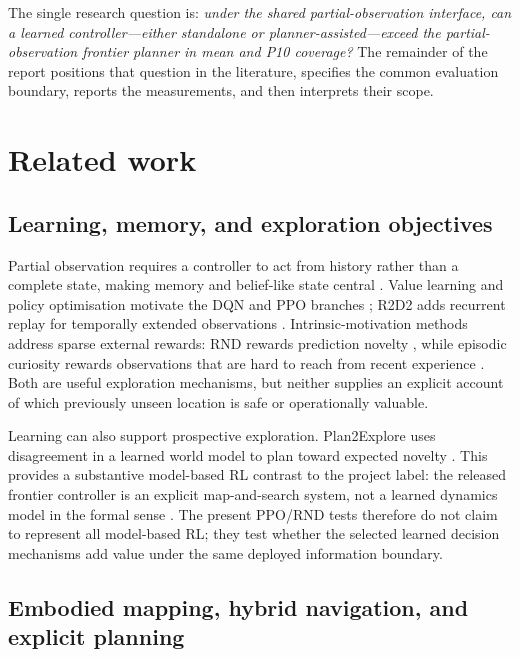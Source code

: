 \documentclass[10pt,letterpaper]{article}
\begin{document}
The single research question is: \emph{under the shared partial-observation interface, can a learned controller---either standalone or planner-assisted---exceed the partial-observation frontier planner in mean and P10 coverage?} The remainder of the report positions that question in the literature, specifies the common evaluation boundary, reports the measurements, and then interprets their scope.

\section{Related work}

\subsection{Learning, memory, and exploration objectives}

Partial observation requires a controller to act from history rather than a complete state, making memory and belief-like state central \citep{kaelbling1998planning,parisotto2018neuralmap}. Value learning and policy optimisation motivate the DQN and PPO branches \citep{watkins1992qlearning,mnih2015human,schulman2017ppo}; R2D2 adds recurrent replay for temporally extended observations \citep{kapturowski2019r2d2}. Intrinsic-motivation methods address sparse external rewards: RND rewards prediction novelty \citep{burda2019rnd}, while episodic curiosity rewards observations that are hard to reach from recent experience \citep{savinov2019episodic}. Both are useful exploration mechanisms, but neither supplies an explicit account of which previously unseen location is safe or operationally valuable.

Learning can also support prospective exploration. Plan2Explore uses disagreement in a learned world model to plan toward expected novelty \citep{sekar2020plan2explore}. This provides a substantive model-based RL contrast to the project label: the released frontier controller is an explicit map-and-search system, not a learned dynamics model in the formal sense \citep{moerland2023survey}. The present PPO/RND tests therefore do not claim to represent all model-based RL; they test whether the selected learned decision mechanisms add value under the same deployed information boundary.

\subsection{Embodied mapping, hybrid navigation, and explicit planning}
\end{document}
